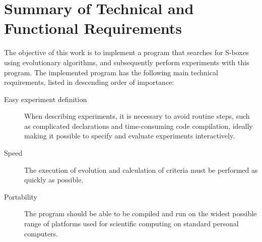 %
%
%
%
%

\section{Summary of Technical and Functional Requirements}
The objective of this work is to implement a program that searches for S-boxes using evolutionary algorithms,
and subsequently perform experiments with this program.
The implemented program has the following main technical requirements, listed
in descending order of importance:
\begin{description}
  \item[Easy experiment definition] When describing experiments, it is necessary
  to avoid routine steps, such as complicated declarations and time-consuming code compilation, ideally
  making it possible to specify and evaluate experiments interactively.
  \item[Speed] The execution of evolution and calculation of criteria must be performed as quickly as possible.
  \item[Portability] The program should be able to be compiled and run on the widest possible range of platforms used
     for scientific computing on standard personal computers.
\end{description}

